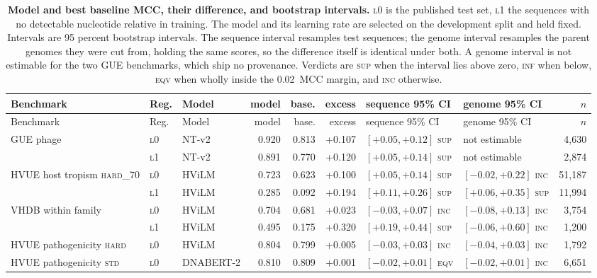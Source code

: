 \begingroup\scriptsize\setlength{\tabcolsep}{1.9pt}
\begin{longtable}{ll l rr r ll r}
\caption{\textbf{Model and best baseline MCC, their difference, and bootstrap intervals.} \textsc{l0} is the published test set, \textsc{l1} the sequences with no detectable nucleotide relative in training. The model and its learning rate are selected on the development split and held fixed. Intervals are 95 percent bootstrap intervals. The sequence interval resamples test sequences; the genome interval resamples the parent genomes they were cut from, holding the same scores, so the difference itself is identical under both. A genome interval is not estimable for the two GUE benchmarks, which ship no provenance. Verdicts are \textsc{sup} when the interval lies above zero, \textsc{inf} when below, \textsc{eqv} when wholly inside the 0.02~MCC margin, and \textsc{inc} otherwise.}
\label{tab:headtohead}\\
\toprule
Benchmark & Reg. & Model & model & base. & excess & sequence 95\% CI & genome 95\% CI & $n$ \\
\midrule\endfirsthead
\toprule Benchmark & Reg. & Model & model & base. & excess & sequence 95\% CI & genome 95\% CI & $n$ \\ \midrule \endhead
GUE phage & \textsc{l0} & NT-v2 & 0.920 & 0.813 & +0.107 & $[+0.05, +0.12]$ \textsc{sup} & not estimable & 4,630 \\
 & \textsc{l1} & NT-v2 & 0.891 & 0.770 & +0.120 & $[+0.05, +0.14]$ \textsc{sup} & not estimable & 2,874 \\
\addlinespace
HVUE host tropism \textsc{hard\_70} & \textsc{l0} & HViLM & 0.723 & 0.623 & +0.100 & $[+0.05, +0.14]$ \textsc{sup} & $[-0.02, +0.22]$ \textsc{inc} & 51,187 \\
 & \textsc{l1} & HViLM & 0.285 & 0.092 & +0.194 & $[+0.11, +0.26]$ \textsc{sup} & $[+0.06, +0.35]$ \textsc{sup} & 11,994 \\
\addlinespace
VHDB within family & \textsc{l0} & HViLM & 0.704 & 0.681 & +0.023 & $[-0.03, +0.07]$ \textsc{inc} & $[-0.08, +0.13]$ \textsc{inc} & 3,754 \\
 & \textsc{l1} & HViLM & 0.495 & 0.175 & +0.320 & $[+0.19, +0.44]$ \textsc{sup} & $[-0.06, +0.60]$ \textsc{inc} & 1,200 \\
\addlinespace
HVUE pathogenicity \textsc{hard} & \textsc{l0} & HViLM & 0.804 & 0.799 & +0.005 & $[-0.03, +0.03]$ \textsc{inc} & $[-0.04, +0.03]$ \textsc{inc} & 1,792 \\
\addlinespace
HVUE pathogenicity \textsc{std} & \textsc{l0} & DNABERT-2 & 0.810 & 0.809 & +0.001 & $[-0.02, +0.01]$ \textsc{eqv} & $[-0.02, +0.01]$ \textsc{inc} & 6,651 \\

\end{longtable}

